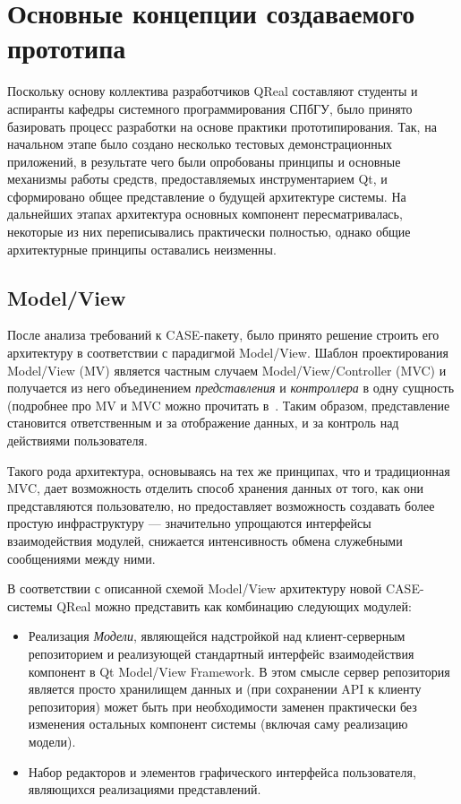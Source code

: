 \documentclass[a5paper]{article}
\begin{document}
\section{Основные концепции создаваемого прототипа}

Поскольку основу коллектива разработчиков
QReal составляют студенты и аспиранты
кафедры системного программирования СПбГУ, было принято базировать
процесс разработки на основе практики прототипирования. Так, на
начальном этапе было создано несколько тестовых демонстрационных
приложений, в результате чего были опробованы принципы и основные
механизмы работы средств, предоставляемых инструментарием Qt, и
сформировано общее представление о будущей архитектуре системы. На
дальнейших этапах архитектура основных компонент пересматривалась,
некоторые из них переписывались практически полностью, однако общие
архитектурные принципы оставались неизменны.

\subsection{Model/View}

После анализа требований к CASE-пакету,
было принято решение строить его архитектуру в соответствии с
парадигмой Model/View.
Шаблон проектирования Model/View (MV) является частным случаем
Model/View/Controller (MVC) и получается из него объединением
\textit{представления} и \textit{контроллера} в одну сущность
(подробнее про MV и MVC можно прочитать в~\cite{somethingAboutMvAndMvc}. Таким образом,
представление становится ответственным и за отображение данных, и за
контроль над действиями пользователя.

Такого рода архитектура, основываясь на тех же принципах, что и
традиционная MVC, дает возможность отделить способ хранения данных от
того, как они представляются пользователю, но предоставляет возможность
создавать более простую инфраструктуру --- значительно упрощаются
интерфейсы взаимодействия модулей, снижается интенсивность обмена
служебными сообщениями между ними.

В соответствии с описанной схемой Model/View архитектуру новой
CASE-системы QReal можно представить как комбинацию следующих модулей:

\begin{itemize}
  \item Реализация \textit{Модели}, являющейся надстройкой над
	клиент-серверным репозиторием и реализующей стандартный интерфейс
	взаимодействия компонент в Qt Model/View Framework. В этом смысле сервер репозитория
	является просто хранилищем данных и (при сохранении
	API к клиенту репозитория) может быть при
	необходимости заменен практически без изменения остальных компонент
	системы (включая саму реализацию модели).
  \item 
	Набор редакторов и элементов графического интерфейса пользователя,
	являющихся реализациями представлений.
\end{itemize}
\end{document}
